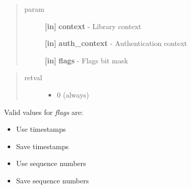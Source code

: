 \documentclass[letterpaper,10pt,english]{sphinxmanual}
\begin{document}
\begin{fulllineitems}
\label{appdev/refs/api/krb5_auth_con_setflags:c.krb5_auth_con_setflags}
\end{fulllineitems}

\begin{quote}\begin{description}
\item[{param}] \leavevmode
\textbf{{[}in{]}} \textbf{context} - Library context

\textbf{{[}in{]}} \textbf{auth\_context} - Authentication context

\textbf{{[}in{]}} \textbf{flags} - Flags bit mask

\end{description}\end{quote}
\begin{quote}\begin{description}
\item[{retval}] \leavevmode\begin{itemize}
\item {} 
0   (always)

\end{itemize}

\end{description}\end{quote}

Valid values for \emph{flags} are:
\begin{itemize}
\item {} 
{\hyperref[appdev/refs/macros/KRB5_AUTH_CONTEXT_DO_TIME:KRB5_AUTH_CONTEXT_DO_TIME]{}} Use timestamps

\item {} 
{\hyperref[appdev/refs/macros/KRB5_AUTH_CONTEXT_RET_TIME:KRB5_AUTH_CONTEXT_RET_TIME]{}} Save timestamps

\item {} 
{\hyperref[appdev/refs/macros/KRB5_AUTH_CONTEXT_DO_SEQUENCE:KRB5_AUTH_CONTEXT_DO_SEQUENCE]{}} Use sequence numbers

\item {} 
{\hyperref[appdev/refs/macros/KRB5_AUTH_CONTEXT_RET_SEQUENCE:KRB5_AUTH_CONTEXT_RET_SEQUENCE]{}} Save sequence numbers

\end{itemize}
\end{document}
